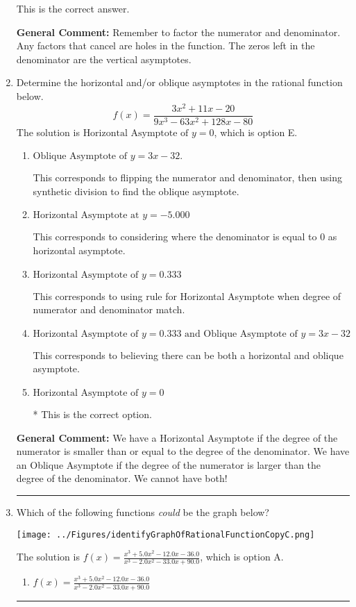 \documentclass{extbook}[14pt]
\newcommand{\litem}[1]{\item #1

\rule{\textwidth}{0.4pt}}
\begin{document}
\begin{enumerate}
{\begin{enumerate}[label=\Alph*.]
This is the correct answer.
\end{enumerate}

\textbf{General Comment:} Remember to factor the numerator and denominator. Any factors that cancel are holes in the function. The zeros left in the denominator are the vertical asymptotes.
}
\litem{
Determine the horizontal and/or oblique asymptotes in the rational function below.
\[ f(x) = \frac{3x^{2} +11 x -20}{9x^{3} -63 x^{2} +128 x -80} \]The solution is \( \text{Horizontal Asymptote of } y = 0 \), which is option E.\begin{enumerate}[label=\Alph*.]
\item \( \text{Oblique Asymptote of } y = 3x -32. \)

This corresponds to flipping the numerator and denominator, then using synthetic division to find the oblique asymptote.
\item \( \text{Horizontal Asymptote at } y = -5.000 \)

This corresponds to considering where the denominator is equal to 0 as horizontal asymptote.
\item \( \text{Horizontal Asymptote of } y = 0.333  \)

This corresponds to using rule for Horizontal Asymptote when degree of numerator and denominator match.
\item \( \text{Horizontal Asymptote of } y = 0.333 \text{ and Oblique Asymptote of } y = 3x -32 \)

This corresponds to believing there can be both a horizontal and oblique asymptote.
\item \( \text{Horizontal Asymptote of } y = 0 \)

* This is the correct option.
\end{enumerate}

\textbf{General Comment:} We have a Horizontal Asymptote if the degree of the numerator is smaller than or equal to the degree of the denominator. We have an Oblique Asymptote if the degree of the numerator is larger than the degree of the denominator. We cannot have both!
}
\litem{
Which of the following functions \textit{could} be the graph below?

\begin{center}
    \texttt{[image: ../Figures/identifyGraphOfRationalFunctionCopyC.png]}
\end{center}


The solution is \( f(x)=\frac{x^{3} +5.0 x^{2} -12.0 x -36.0}{x^{3} -2.0 x^{2} -33.0 x + 90.0} \), which is option A.\begin{enumerate}[label=\Alph*.]
\item \( f(x)=\frac{x^{3} +5.0 x^{2} -12.0 x -36.0}{x^{3} -2.0 x^{2} -33.0 x + 90.0} \)


\end{enumerate}}
\end{enumerate}
\end{document}
